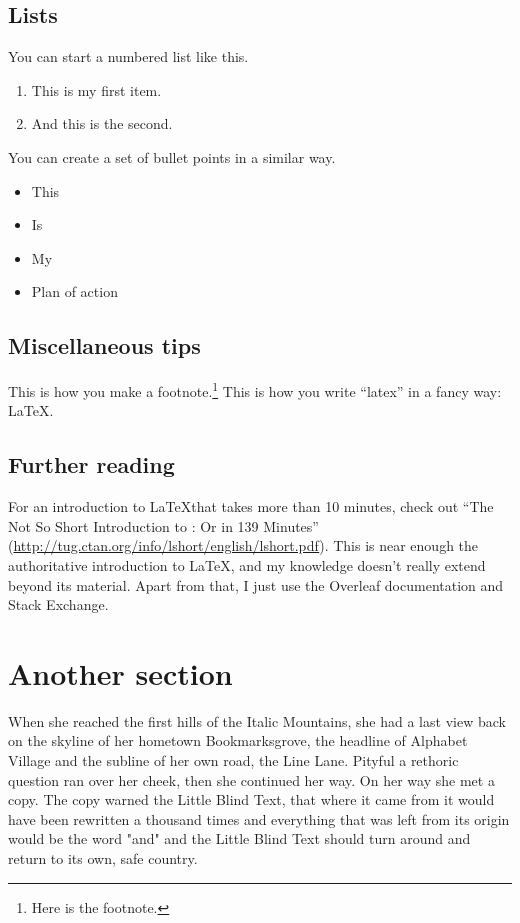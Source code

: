 \documentclass[11pt]{article}
\begin{document}
\subsection{Lists}

You can start a numbered list like this.

\begin{enumerate}
    \item This is my first item.
    \item And this is the second.
\end{enumerate}

You can create a set of bullet points in a similar way.

\begin{itemize}
    \item This
    \item Is
    \item My
    \item Plan of action
\end{itemize}

\subsection{Miscellaneous tips}

This is how you make a footnote.\footnote{Here is the footnote.} This is how you write ``latex'' in a fancy way: \LaTeX.

\subsection{Further reading}

For an introduction to \LaTeX that takes more than 10 minutes, check out ``The Not So Short Introduction to \LaTeXe: Or \LaTeXe in 139 Minutes'' (\url{http://tug.ctan.org/info/lshort/english/lshort.pdf}). This is near enough the authoritative introduction to \LaTeX, and my knowledge doesn't really extend beyond its material. Apart from that, I just use the Overleaf documentation and Stack Exchange.

\section{Another section}

When she reached the first hills of the Italic Mountains, she had a last view back on the skyline of her hometown Bookmarksgrove, the headline of Alphabet Village and the subline of her own road, the Line Lane. Pityful a rethoric question ran over her cheek, then she continued her way. On her way she met a copy. The copy warned the Little Blind Text, that where it came from it would have been rewritten a thousand times and everything that was left from its origin would be the word "and" and the Little Blind Text should turn around and return to its own, safe country.
\end{document}
